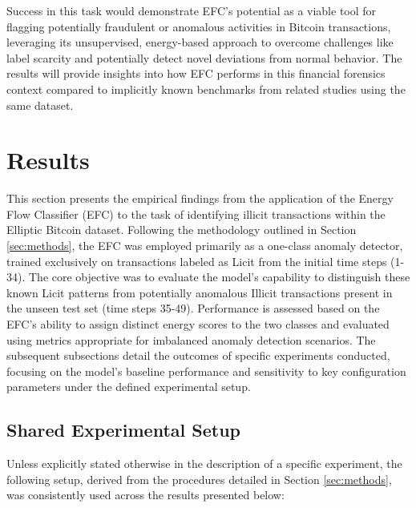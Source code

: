 \documentclass[12pt]{article}
\begin{document}
Success in this task would demonstrate EFC's potential as a viable tool for flagging potentially fraudulent or anomalous
activities in Bitcoin transactions, leveraging its unsupervised, energy-based approach to overcome challenges like label
scarcity and potentially detect novel deviations from normal behavior. The results will provide insights into how EFC
performs in this financial forensics context compared to implicitly known benchmarks from related studies using the same
dataset.

\section{Results} \label{sec:results}

This section presents the empirical findings from the application of the Energy Flow Classifier (EFC) to the task of
identifying illicit transactions within the Elliptic Bitcoin dataset. Following the methodology outlined in Section
\ref{sec:methods}, the EFC was employed primarily as a one-class anomaly detector, trained exclusively on transactions
labeled as Licit from the initial time steps (1-34). The core objective was to evaluate the model's capability to distinguish
these known Licit patterns from potentially anomalous Illicit transactions present in the unseen test set (time steps 35-49).
Performance is assessed based on the EFC's ability to assign distinct energy scores to the two classes and evaluated using
metrics appropriate for imbalanced anomaly detection scenarios. The subsequent subsections detail the outcomes of specific
experiments conducted, focusing on the model's baseline performance and sensitivity to key configuration parameters under
the defined experimental setup.

\subsection{Shared Experimental Setup} \label{subsec:shared_setup}

Unless explicitly stated otherwise in the description of a specific experiment, the following setup, derived from the procedures
detailed in Section \ref{sec:methods}, was consistently used across the results presented below:
\end{document}
